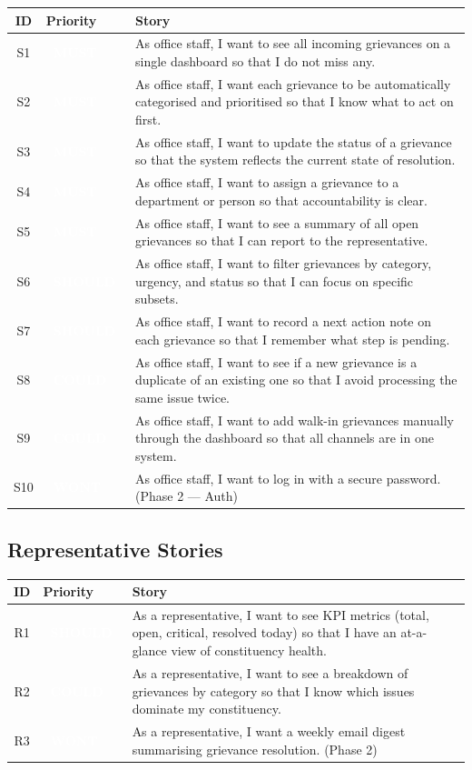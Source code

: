 \documentclass[11pt, a4paper]{article}
\newcommand{\must}{\textcolor{white}{\colorbox{mustcol}{\textbf{\ MUST\ }}}}
\newcommand{\should}{\textcolor{white}{\colorbox{shouldcol}{\textbf{\ SHOULD\ }}}}
\newcommand{\could}{\textcolor{white}{\colorbox{couldcol}{\textbf{\ COULD\ }}}}
\newcommand{\wont}{\textcolor{white}{\colorbox{wontcol}{\textbf{\ WONT\ }}}}
\begin{document}
\begin{tabularx}{\linewidth}{clX}
\toprule
\textbf{ID} & \textbf{Priority} & \textbf{Story} \\
\midrule
S1  & \must   & As office staff, I want to see all incoming grievances on a single dashboard so that I do not miss any. \\
S2  & \must   & As office staff, I want each grievance to be automatically categorised and prioritised so that I know what to act on first. \\
S3  & \must   & As office staff, I want to update the status of a grievance so that the system reflects the current state of resolution. \\
S4  & \must   & As office staff, I want to assign a grievance to a department or person so that accountability is clear. \\
S5  & \must   & As office staff, I want to see a summary of all open grievances so that I can report to the representative. \\
S6  & \should & As office staff, I want to filter grievances by category, urgency, and status so that I can focus on specific subsets. \\
S7  & \should & As office staff, I want to record a next action note on each grievance so that I remember what step is pending. \\
S8  & \could  & As office staff, I want to see if a new grievance is a duplicate of an existing one so that I avoid processing the same issue twice. \\
S9  & \could  & As office staff, I want to add walk-in grievances manually through the dashboard so that all channels are in one system. \\
S10 & \wont   & As office staff, I want to log in with a secure password. (Phase 2 --- Auth) \\
\bottomrule
\end{tabularx}

\subsection{Representative Stories}

\begin{tabularx}{\linewidth}{clX}
\toprule
\textbf{ID} & \textbf{Priority} & \textbf{Story} \\
\midrule
R1 & \should & As a representative, I want to see KPI metrics (total, open, critical, resolved today) so that I have an at-a-glance view of constituency health. \\
R2 & \could  & As a representative, I want to see a breakdown of grievances by category so that I know which issues dominate my constituency. \\
R3 & \wont   & As a representative, I want a weekly email digest summarising grievance resolution. (Phase 2) \\
\bottomrule
\end{tabularx}
\end{document}
